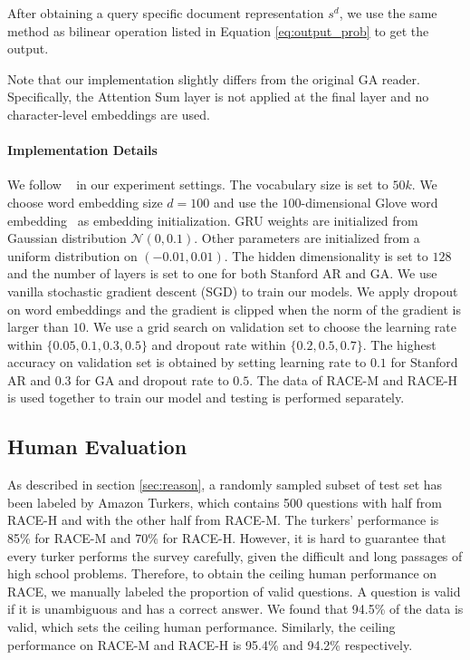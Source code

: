 After obtaining a query specific document representation $s^d$, we use the same method as bilinear operation listed in Equation \ref{eq:output_prob} to get the output.

Note that our implementation slightly differs from the original GA reader. Specifically, the Attention Sum layer is not applied at the final layer and no character-level embeddings are used. 

\paragraph{Implementation Details} We follow ~\citet{chen2016thorough} in our experiment settings. The vocabulary size is set to $50k$. We choose word embedding size $d=100$ and use the $100$-dimensional Glove word embedding~\citep{pennington2014glove} as embedding initialization. GRU weights are initialized from Gaussian distribution $\mathcal{N}(0, 0.1)$. Other parameters are initialized from a uniform distribution on $(-0.01, 0.01)$. The hidden dimensionality is set to $128$ and the number of layers is set to one for both Stanford AR and GA. We use vanilla stochastic gradient descent (SGD) to train our models. We apply dropout on word embeddings and the gradient is clipped when the norm of the gradient is larger than $10$. We use a grid search on validation set to choose the learning rate within $\{0.05, 0.1, 0.3, 0.5\}$ and dropout rate within $\{0.2, 0.5, 0.7\}$. The highest accuracy on validation set is obtained by setting learning rate to $0.1$ for Stanford AR and $0.3$ for GA and dropout rate to $0.5$. The data of RACE-M and RACE-H is used together to train our model and testing is performed separately. 

\subsection{Human Evaluation}
\label{sec:human_perform}

As described in section \ref{sec:reason}, a randomly sampled subset of test set has been labeled by Amazon Turkers, which contains 500 questions with half from RACE-H and with the other half from RACE-M. The turkers' performance is 85\% for RACE-M and 70\% for RACE-H. However, it is hard to guarantee that every turker performs the survey carefully, given the difficult and long passages of high school problems. Therefore, to obtain the ceiling human performance on RACE, we manually labeled the proportion of valid questions. A question is valid if it is unambiguous and has a correct answer. We found that 94.5\% of the data is valid, which sets the ceiling human performance. Similarly, the ceiling performance on RACE-M and RACE-H is 95.4\% and 94.2\% respectively.

